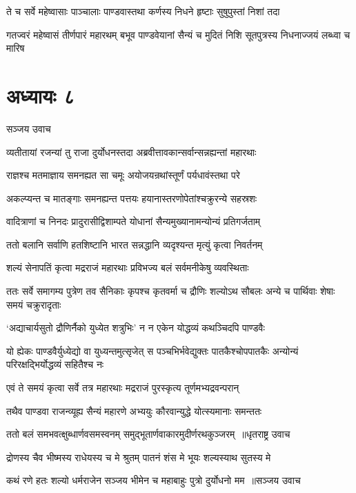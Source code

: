 \twolineshloka
{ते च सर्वे महेष्वासाः पाञ्चालाः पाण्डवास्तथा}
{कर्णस्य निधने हृष्टाः सुषुपुस्तां निशां तदा}


\threelineshloka
{गतज्वरं महेष्वासं तीर्णपारं महारथम्}
{बभूव पाण्डवेयानां सैन्यं च मुदितं निशि}
{सूतपुत्रस्य निधनाज्जयं लब्ध्वा च मारिष}


\chapter{अध्यायः ८}
\twolineshloka
{सञ्जय उवाच}
{}


\twolineshloka
{व्यतीतायां रजन्यां तु राजा दुर्योधनस्तदा}
{अब्रवीत्तावकान्सर्वान्सन्नह्यन्तां महारथाः}


\twolineshloka
{राज्ञश्च मतमाज्ञाय समनह्यत सा चमूः}
{अयोजयन्रथांस्तूर्णं पर्यधावंस्तथा परे}


\twolineshloka
{अकल्प्यन्त च मातङ्गाः समनह्यन्त पत्तयः}
{हयानास्तरणोपेतांश्चक्रुरन्ये सहस्रशः}


\twolineshloka
{वादित्राणां च निनदः प्रादुरासीद्विशाम्पते}
{योधानां सैन्यमुख्यानामन्योन्यं प्रतिगर्जताम्}


\twolineshloka
{ततो बलानि सर्वाणि हतशिष्टानि भारत}
{सन्नद्धानि व्यदृश्यन्त मृत्युं कृत्वा निवर्तनम्}


\twolineshloka
{शल्यं सेनापतिं कृत्वा मद्रराजं महारथाः}
{प्रविभज्य बलं सर्वमनीकेषु व्यवस्थिताः}


\threelineshloka
{ततः सर्वे समागम्य पुत्रेण तव सैनिकाः}
{कृपश्च कृतवर्मा च द्रौणिः शल्योऽथ सौबलः}
{अन्ये च पार्थिवाः शेषाः समयं चक्रुरादृताः}


\twolineshloka
{`अद्याचार्यसुतो द्रौणिर्नैको युध्येत शत्रुभिः'}
{न न एकेन योद्धव्यं कथञ्चिदपि पाण्डवैः}


\threelineshloka
{यो ह्येकः पाण्डवैर्युध्येद्यो वा युध्यन्तमुत्सृजेत्}
{स पञ्चभिर्भवेद्युक्तः पातकैश्चोपपातकैः}
{अन्योन्यं परिरक्षद्भिर्योद्धव्यं सहितैश्च नः}


\twolineshloka
{एवं ते समयं कृत्वा सर्वे तत्र महारथाः}
{मद्रराजं पुरस्कृत्य तूर्णमभ्यद्रवन्परान्}


\twolineshloka
{तथैव पाण्डवा राजन्व्यूह्य सैन्यं महारणे}
{अभ्ययुः कौरवान्युद्धे योत्स्यमानाः समन्ततः}


\threelineshloka
{ततो बलं समभवत्क्षुब्धार्णवसमस्वनम्}
{समुद्भूतार्णवाकारमुदीर्णरथकुञ्जरम् ॥धृतराष्ट्र उवाच}
{}


\twolineshloka
{द्रोणस्य चैव भीष्मस्य राधेयस्य च मे श्रुतम्}
{पातनं शंस मे भूयः शल्यस्याथ सुतस्य मे}


\threelineshloka
{कथं रणे हतः शल्यो धर्मराजेन सञ्जय}
{भीमेन च महाबाहुः पुत्रो दुर्योधनो मम ॥सञ्जय उवाच}
{}


